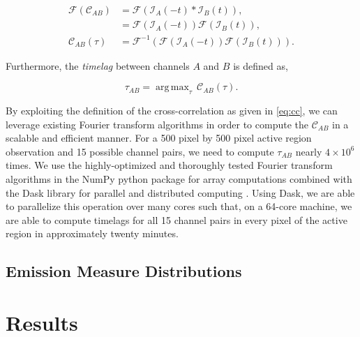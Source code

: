 \documentclass[preprint,linenumbers]{aastex62}
\DeclareMathOperator*{\argmax}{arg\,max} %
\newcommand{\AR}{active region }
\begin{document}
\begin{align}\label{eq:cc}
    \mathcal{F}(\mathcal{C}_{AB}) &= \mathcal{F}(\mathcal{I}_A(-t)\ast\mathcal{I}_B(t)), \nonumber\\
    &= \mathcal{F}(\mathcal{I}_A(-t))\mathcal{F}(\mathcal{I}_B(t)), \nonumber\\
    \mathcal{C}_{AB}(\tau) &= \mathcal{F}^{-1}(\mathcal{F}(\mathcal{I}_A(-t))\mathcal{F}(\mathcal{I}_B(t))).
\end{align}

Furthermore, the \textit{timelag} between channels $A$ and $B$ is defined as,

\begin{equation}
    \tau_{AB} = \argmax_{\tau}\,\mathcal{C}_{AB}(\tau).
\end{equation}


By exploiting the definition of the cross-correlation as given in \autoref{eq:cc}, we can leverage existing Fourier transform algorithms in order to compute the $\mathcal{C}_{AB}$ in a scalable and efficient manner. For a 500 pixel by 500 pixel active region observation and 15 possible channel pairs, we need to compute $\tau_{AB}$ nearly $4\times10^6$ times. We use the highly-optimized and thoroughly tested Fourier transform algorithms in the NumPy python package for array computations \citep{oliphant_guide_2006} combined with the Dask library for parallel and distributed computing \citep{dask_development_team_dask_2016}. Using Dask, we are able to parallelize this operation over many cores such that, on a 64-core machine, we are able to compute timelags for all 15 channel pairs in every pixel of the \AR in approximately twenty minutes. 


\subsection{Emission Measure Distributions}
\label{em_dist}


\section{Results}
\label{results}
\end{document}
